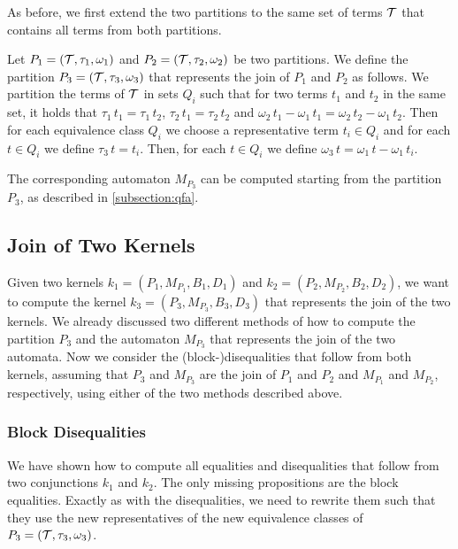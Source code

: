 As before, we first extend the two partitions to the same set of terms $\mathcal{T}$ that contains all terms from both partitions.

Let $P_1 = (\mathcal{T}, \tau_1, \omega_1)$ and $P_2 = (\mathcal{T}, \tau_2, \omega_2)$ be two partitions.
We define the partition $P_3 = (\mathcal{T}, \tau_3, \omega_3)$ that represents the join of $P_1$ and $P_2$ as follows.
We partition the terms of $\mathcal{T}$ in sets $Q_i$ such that for two terms $t_1$ and $t_2$ in the same set,
it holds that $\tau_1\,t_1 = \tau_1\,t_2$, $\tau_2\,t_1 = \tau_2\,t_2$ and $\omega_2\,t_1 -\omega_1\,t_1 = \omega_2\,t_2 - \omega_1\,t_2$.
Then for each equivalence class $Q_i$ we choose a representative term $t_i\in Q_i$ and
for each $t \in Q_i$ we define $\tau_3\,t = t_i$.
Then, for each $t \in Q_i$ we define $\omega_3\,t = \omega_1\,t - \omega_1\,t_i$.

The corresponding automaton $M_{P_3}$ can be computed starting from the partition $P_3$,
as described in \cref{subsection:qfa}.

\subsection{Join of Two Kernels}

Given two kernels $k_1 = (P_1, M_{P_1},B_1, D_1)$ and $k_2 = (P_2, M_{P_2},B_2, D_2)$, we want to compute the kernel $k_3 = (P_3, M_{P_3},B_3, D_3)$ that represents the join of the two kernels.
We already discussed two different methods of how to compute the partition $P_3$ and the automaton $M_{P_3}$ that represents the join of the two automata.
Now we consider the (block-)disequalities that follow from both kernels,
assuming that $P_3$ and $M_{P_3}$ are the join of $P_1$ and $P_2$ and $M_{P_1}$ and $M_{P_2}$, respectively,
using either of the two methods described above.

\subsubsection{Block Disequalities}

We have shown how to compute all equalities and disequalities that follow from two conjunctions $k_1$ and $k_2$.
The only missing propositions are the block equalities.
Exactly as with the disequalities, we need to rewrite them such that they use the new representatives of the new equivalence classes of $P_3 = (\mathcal{T}, \tau_3, \omega_3)$.

